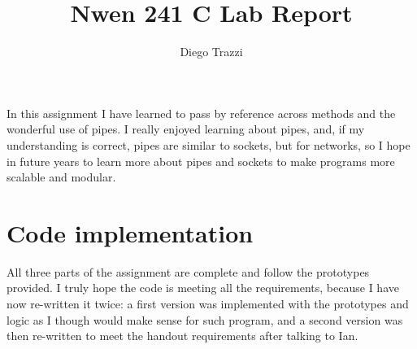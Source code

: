 \documentclass[11pt, oneside]{article} %
\title{Nwen 241 C Lab Report}
\author{Diego Trazzi}
\begin{document}
\maketitle
In this assignment I have learned to pass by reference across methods and the wonderful use of pipes. I really enjoyed learning about pipes, and, if my understanding is correct, pipes are similar to sockets, but for networks, so I hope in future years to learn more about pipes and sockets to make programs more scalable and modular.
\section{Code implementation}
All three parts of the assignment are complete and follow the prototypes provided. I truly hope the code is meeting all the requirements, because I have now re-written it twice: a first version was implemented with the prototypes and logic as I though would make sense for such program, and a second version was then re-written to meet the handout requirements after talking to Ian.
\end{document}
